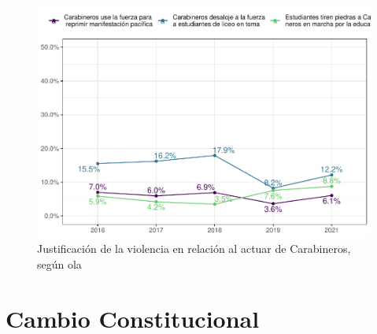 \documentclass[
  12pt,
]{book}
\begin{document}
\begin{figure}

{\centering \includegraphics{reporte-elsoc_files/figure-latex/just-carab-ola-1} 

}

\caption{Justificación de la violencia en relación al actuar de Carabineros, según ola}\label{fig:just-carab-ola}
\end{figure}

\hypertarget{cambio-constitucional}{%
\chapter{Cambio Constitucional}\label{cambio-constitucional}}
\end{document}

